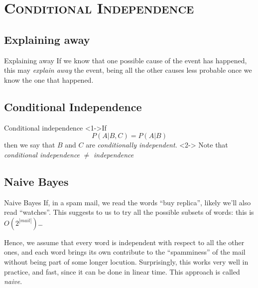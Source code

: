 \documentclass[xcolor=x11names,compress]{beamer}
\renewcommand{\(}{\begin{columns}}
\renewcommand{\)}{\end{columns}}
\newcommand{\<}[1]{\begin{column}{#1}}
\renewcommand{\>}{\end{column}}
\begin{document}
\section{\scshape Conditional Independence}
\subsection{Explaining away}
\begin{frame}{Explaining away}
    If we know that one possible cause of the event has happened, this may \textit{explain away} the event, being all the other causes less probable once we know the one that happened.
\end{frame}


\subsection{Conditional Independence}
\begin{frame}{Conditional independence}
    <1->{If
    $$
    P(A|B,C) = P(A|B)
    $$
    then we say that $B$ and $C$ are \textit{conditionally independent}.}
    <2->{
        Note that \textit{conditional independence} $\neq$ \textit{independence}
    }
\end{frame}

\subsection{Naive Bayes}
\begin{frame}{Naive Bayes}
    If, in a spam mail, we read the words ``buy replica'', likely we'll also read ``watches''. This suggests to us to try all the possible subsets of words: this is $O(2^{|mail|})$\dots
    
    Hence, we assume that every word is independent with respect to all the other ones, and each word brings its own contribute to the ``spamminess'' of the mail without being part of some longer locution. Surprisingly, this works very well in practice, and fast, since it can be done in linear time. This approach is called \textit{naive}.
\end{frame}

\end{document}
